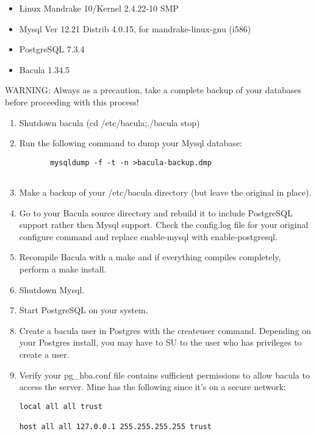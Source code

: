 \begin{itemize}
\item Linux Mandrake 10/Kernel 2.4.22-10 SMP 
\item Mysql Ver 12.21 Distrib 4.0.15, for mandrake-linux-gnu (i586) 
\item PostgreSQL 7.3.4 
\item Bacula 1.34.5 
   \end{itemize}

WARNING: Always as a precaution, take a complete backup of your databases
before proceeding with this process! 

\begin{enumerate}
\item Shutdown bacula (cd /etc/bacula;./bacula stop)  
\item Run the following command to dump your Mysql database:  

   \footnotesize
\begin{verbatim}
       mysqldump -f -t -n >bacula-backup.dmp
    
\end{verbatim}
\normalsize

\item Make a backup of your /etc/bacula directory (but leave the  original in
   place).  
\item Go to your Bacula source directory and rebuild it to include  PostgreSQL
   support rather then Mysql support. Check the  config.log file for your
   original configure command and replace  enable-mysql with enable-postgresql.  
\item Recompile Bacula with a make and if everything compiles  completely,
   perform a make install.  
\item Shutdown Mysql. 
\item Start PostgreSQL on your system.  
\item Create a bacula user in Postgres with the createuser command.  Depending on
   your Postgres install, you may have to SU to the  user who has privileges to
   create a user.  
\item Verify your pg\_hba.conf file contains sufficient permissions to  allow
   bacula to access the server. Mine has the following since  it's on a secure
   network:  

\footnotesize
\begin{verbatim}
local all all trust
                
host all all 127.0.0.1 255.255.255.255 trust
                

\end{verbatim}
\end{enumerate}
